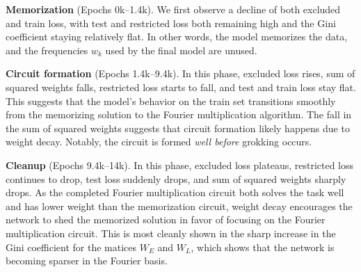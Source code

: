 \documentclass{article} %
\begin{document}
\textbf{Memorization} (Epochs 0k--1.4k). We first observe a decline of both excluded and train loss, with test and restricted loss both remaining high and the Gini coefficient staying relatively flat. In other words, the model memorizes the data, and the frequencies $w_k$ used by the final model are unused. %

\textbf{Circuit formation} (Epochs 1.4k--9.4k). In this phase, excluded loss rises, sum of squared weights falls, restricted loss starts to fall, and test and train loss stay flat. %
This suggests that the model's behavior on the train set transitions smoothly from the memorizing solution to the Fourier multiplication algorithm. %
The fall in the sum of squared weights suggests that circuit formation likely happens due to weight decay. Notably, the circuit is formed \emph{well before} grokking occurs. %



\textbf{Cleanup} (Epochs 9.4k--14k). In this phase, excluded loss plateaus, restricted loss continues to drop, test loss suddenly drops, and sum of squared weights sharply drops. As the completed Fourier multiplication circuit both solves the task well and has lower weight than the memorization circuit, weight decay encourages the network to shed the memorized solution in favor of focusing on the Fourier multiplication circuit. This is most cleanly shown in the sharp increase in the Gini coefficient for the matices $W_E$ and $W_L$, which shows that the network is becoming sparser in the Fourier basis.
\end{document}
